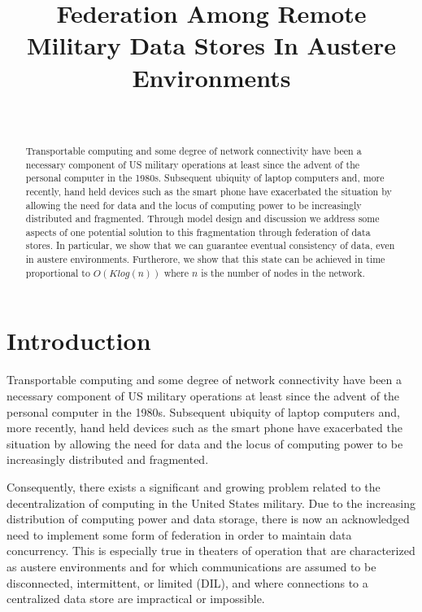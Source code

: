 \documentclass[10pt]{./IEEEtran}
\begin{document}
\title{Federation Among Remote Military Data Stores In Austere Environments}

\author{\\
}


\maketitle


\begin{abstract}
Transportable computing and some degree of network connectivity have been a necessary component of US military operations at least since the advent of the personal computer in the 1980s.  Subsequent ubiquity of laptop computers and, more recently, hand held devices such as the smart phone have exacerbated the situation by allowing the need for data and the locus of computing power to be increasingly distributed and fragmented.  Through model design and discussion we address some aspects of one potential solution to this fragmentation through federation of data stores.  In particular, we show that we can guarantee eventual consistency of data, even in austere environments.  Furtherore, we show that this state can be achieved in time proportional to $O(K log(n))$ where $n$ is the number of nodes in the network.
\end{abstract}


\IEEEpeerreviewmaketitle


\section{Introduction}
Transportable computing and some degree of network connectivity have been a necessary component of US military operations at least since the advent of the personal computer in the 1980s.  Subsequent ubiquity of laptop computers and, more recently, hand held devices such as the smart phone have exacerbated the situation by allowing the need for data and the locus of computing power to be increasingly distributed and fragmented.  

Consequently, there exists a significant and growing problem related to the decentralization of computing in the United States military.  Due to the increasing distribution of computing power and data storage, there is now an acknowledged need to implement some form of federation\cite{Takai:2012} in order to maintain data concurrency.  This is especially true in theaters of operation that are characterized as austere environments and for which communications are assumed to be disconnected, intermittent, or limited (DIL), and where connections to a centralized data store are impractical or impossible.
\end{document}
